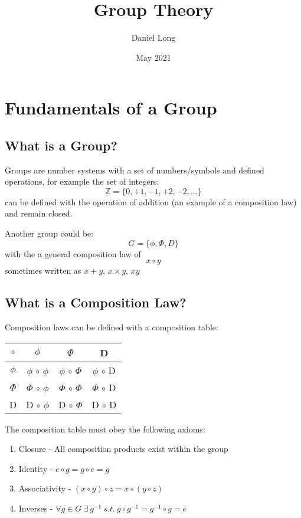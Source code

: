 \documentclass{article}
\title{Group Theory}
\author{Daniel Long}
\date{May 2021}
\begin{document}
\maketitle

\tableofcontents

\section{Fundamentals of a Group}

\subsection{What is a Group?}

Groups are number systems with a set of numbers/symbols and defined operations, for example the set of integers:
\[ \mathbb{Z} = \{ 0, +1, -1, +2, -2, ... \} \]
can be defined with the operation of addition (an example of a composition law) and remain closed.

Another group could be:
\[ G= \{ \phi, \Phi, D \} \]
with the a general composition law of
\[ x \circ y \]
sometimes written as \( x + y \), \( x \times y \), \( xy \)

\subsection{What is a Composition Law?}

Composition laws can be defined with a composition table:

\begin{center}
\begin{tabular}{ |c|c c c| } 
 \hline
 $\circ$ & $\phi$ & $\Phi$ & D \\
 \hline
 $\phi$ & $\phi$ $\circ$ $\phi$ & $\phi$ $\circ$ $\Phi$ & $\phi$ $\circ$ D \\
 $\Phi$ & $\Phi$ $\circ$ $\phi$ & $\Phi$ $\circ$ $\Phi$ & $\Phi$ $\circ$ D \\
 D & D $\circ$ $\phi$ & D $\circ$ $\Phi$ & D $\circ$ D \\
 \hline
\end{tabular}
\end{center}

The composition table must obey the following axioms:
\begin{enumerate}
 \item Closure - All composition products exist within the group
 \item Identity - \( e \circ g = g \circ e = g \)
 \item Associativity - \((x \circ y) \circ z = x \circ (y \circ z)\)
 \item Inverses - \(\forall g \in G \: \exists \: g^{-1} \:  s.t. \: g \circ g^{-1} = g^{-1} \circ g = e\)
\end{enumerate}
\end{document}
